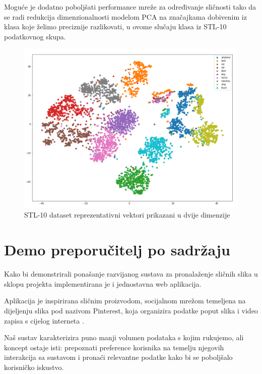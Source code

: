 \documentclass[times, utf8, proizvoljni, numeric]{fer}
\begin{document}
Moguće je dodatno poboljšati performance mreže za određivanje sličnosti tako da se radi redukcija dimenzionalnosti modelom PCA na značajkama dobivenim iz klasa koje želimo preciznije razlikovati, u ovome slučaju klasa iz STL-10 podatkovnog skupa.

\begin{figure}[!ht]
	\begin{center}
		\captionsetup{justification=centering}
		\includegraphics[width=1.\textwidth]{./imgs/stl_10_tsne.png}
		\caption{STL-10 dataset reprezentativni vektori prikazani u dvije dimenzije}
		\label{fg:stl_10_tsne}
	\end{center}
\end{figure}

\chapter{Demo preporučitelj po sadržaju}

Kako bi demonstrirali ponašanje razvijanog sustava za pronalaženje sličnih slika u sklopu projekta implementirana je i jednostavna web aplikacija. 

Aplikacija je inspirirana sličnim proizvodom, socijalnom mrežom temeljena na dijeljenju slika pod nazivom Pinterest, koja organizira podatke poput slika i video zapisa s cijelog interneta \cite{wiki-pintrest}. 

Naš sustav karakterizira puno manji volumen podataka s kojim rukujemo, ali koncept ostaje isti: prepoznati preference korisnika na temelju njegovih interakcija sa sustavom i pronaći relevantne podatke kako bi se poboljšalo korisničko iskustvo.
\end{document}
